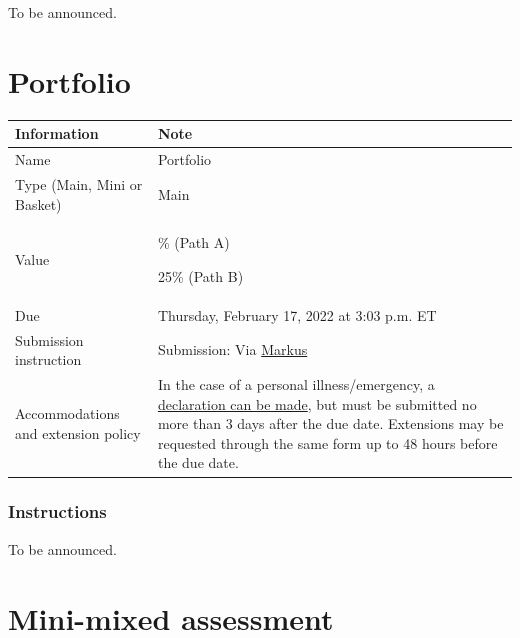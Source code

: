 \documentclass[
  openany]{book}
\begin{document}
To be announced.

\hypertarget{portfolio}{%
\chapter{Portfolio}\label{portfolio}}

\begin{longtable}[]{@{}
  >{\raggedright\arraybackslash}p{}
  >{\raggedright\arraybackslash}p{}@{}}
\toprule
\textbf{Information} & \textbf{Note} \\
\midrule
\endhead
Name & Portfolio \\
Type (Main, Mini or Basket) & Main \\
Value & 20\% (Path A)

25\% (Path B) \\
Due & Thursday, February 17, 2022 at 3:03 p.m. ET \\
Submission instruction & Submission: Via \href{https://markus-ds.teach.cs.toronto.edu/}{Markus} \\
Accommodations and extension policy & In the case of a personal illness/emergency, a \href{https://forms.office.com/Pages/ResponsePage.aspx?id=JsKqeAMvTUuQN7RtVsVSEOKHUU3SzAJJhmOKjJhDWEpUNTFDSzhZTFlXUzVYMVlNM1FEUTRZMkVWOC4u}{declaration can be made}, but must be submitted no more than 3 days after the due date. Extensions may be requested through the same form up to 48 hours before the due date. \\
\bottomrule
\end{longtable}

\hypertarget{instructions-1}{%
\subsection{Instructions}\label{instructions-1}}

To be announced.

\hypertarget{mini-mixed-assessment}{%
\chapter{Mini-mixed assessment}\label{mini-mixed-assessment}}
\end{document}

